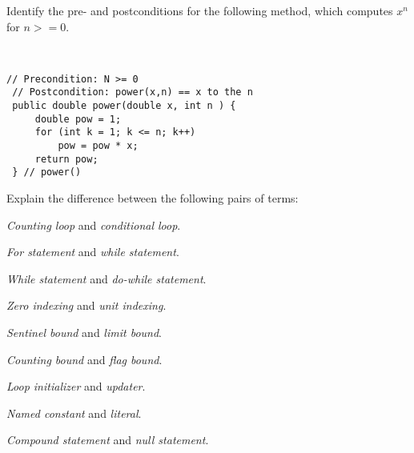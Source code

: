 \begin{ANS}
\item  Identify the pre- and postconditions for the following method, which
computes $x^n$ for $n >= 0$.

\mbox{ }
\begin{jjjlisting}
\begin{lstlisting}[basicstyle=\scriptsize]
 // Precondition: N >= 0
 // Postcondition: power(x,n) == x to the n
 public double power(double x, int n ) {
     double pow = 1;
     for (int k = 1; k <= n; k++)
         pow = pow * x;
     return pow;
 } // power()
\end{lstlisting}
\end{jjjlisting}
\end{ANS}


\begin{EXRtwo}

\item  Explain the difference between the following pairs of terms:
\begin{EXRtwoLL}
\item  {\it Counting loop} and {\it conditional loop}.
\item  {\it For statement} and {\it while statement}.
\item  {\it While statement} and {\it do-while statement}.
\item  {\it Zero indexing} and {\it unit indexing}.
\item  {\it Sentinel bound} and {\it limit bound}.
\item  {\it Counting bound} and {\it flag bound}.
\item  {\it Loop initializer} and {\it updater}.
\item  {\it Named constant} and {\it literal}.
\item  {\it Compound statement} and {\it null statement}.
\end{EXRtwoLL}


\end{EXRtwo}
